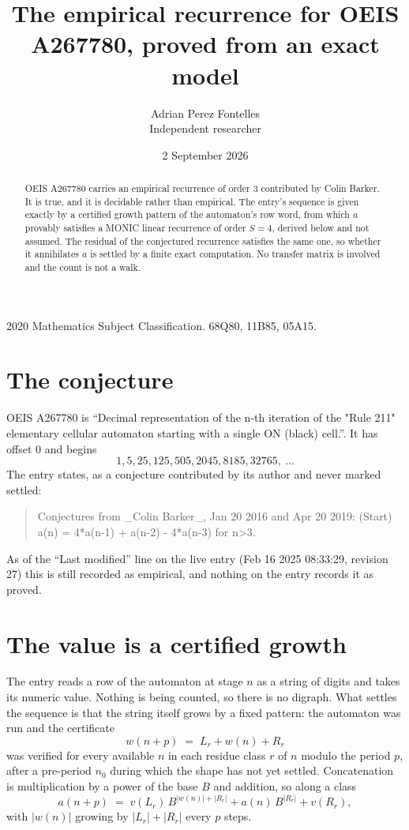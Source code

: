\documentclass[11pt,a4paper]{article}
\title{The empirical recurrence for OEIS A267780, proved from an exact model}
\author{Adrian Perez Fontelles\\ \small Independent researcher}
\date{2 September 2026}
\theoremstyle{plain}
\theoremstyle{definition}
\begin{document}
\maketitle

\begin{abstract}
OEIS A267780 carries an empirical recurrence of order $3$ contributed by Colin Barker. It is true, and it is
decidable rather than empirical. The entry's sequence is given exactly by a certified growth pattern of the automaton's row word, from
which $a$ provably satisfies a MONIC linear recurrence of order $S=4$, derived below and not
assumed. The residual of the conjectured recurrence satisfies the same one, so whether it
annihilates $a$ is settled by a finite exact computation. No transfer matrix is involved and
the count is not a walk.
\end{abstract}

\noindent\small 2020 Mathematics Subject Classification. 68Q80, 11B85, 05A15.\normalsize

\section{The conjecture}

OEIS A267780 is ``Decimal representation of the n-th iteration of the "Rule 211" elementary cellular automaton starting with a single ON (black) cell.''. It has offset $0$ and begins
\[
1, 5, 25, 125, 505, 2045, 8185, 32765,\ \dots
\]
The entry states, as a conjecture contributed by its author and never marked settled:
\begin{quote}
Conjectures from \_Colin Barker\_, Jan 20 2016 and Apr 20 2019: (Start) a(n) = 4*a(n-1) + a(n-2) - 4*a(n-3) for n>3.
\end{quote}
As of the ``Last modified'' line on the live entry (Feb 16 2025 08:33:29, revision 27)
this is still recorded as empirical, and nothing on the entry records it as proved.

\section{The value is a certified growth}

The entry reads a row of the automaton at stage $n$ as a string of digits and takes its
numeric value. Nothing is being counted, so there is no digraph. What settles the sequence is
that the string itself grows by a fixed pattern: the automaton was run and the certificate
\[
w(n+p)\;=\;L_r + w(n) + R_r
\]
was verified for every available $n$ in each residue class $r$ of $n$ modulo the period $p$,
after a pre-period $n_0$ during which the shape has not yet settled. Concatenation is
multiplication by a power of the base $B$ and addition, so along a class
\[
a(n+p)\;=\;v(L_r)\,B^{|w(n)|+|R_r|} + a(n)\,B^{|R_r|} + v(R_r),
\]
with $|w(n)|$ growing by $|L_r|+|R_r|$ every $p$ steps.
\end{document}
